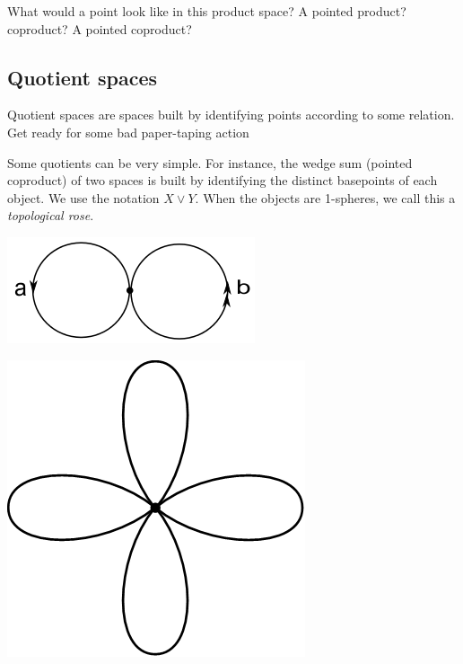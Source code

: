 \documentclass[tikz]{beamer}
\theoremstyle{definition}
\begin{document}
\frame
{
	What would a point look like in this product space? A pointed product? coproduct? A pointed coproduct?
}

\subsection{Quotient spaces}
\frame 
{
        	Quotient spaces are spaces built by identifying points according to some relation. Get ready for some bad paper-taping action
}

\frame 
{
	Some quotients can be very simple. For instance, the wedge sum (pointed coproduct) of two spaces is built by identifying the distinct basepoints of each object. We use the notation $X \vee Y$. When the objects are 1-spheres, we call this a \textit{topological rose}.
	
	\begin{center}
		\includegraphics[scale=0.5]{wedge}
	\end{center}
	
	\begin{center}
		\includegraphics[scale=0.3]{rose}
	\end{center}
	
}
\end{document}
